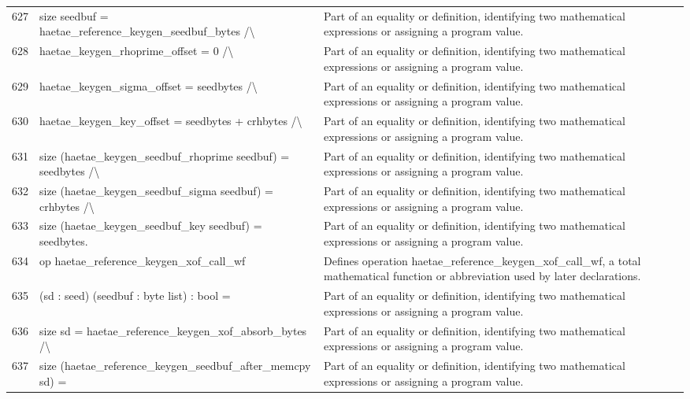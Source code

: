 \documentclass[10pt]{article}
\begin{document}
\begin{longtable}{r L{0.53\textwidth} L{0.37\textwidth}}
627 & {\ttfamily\scriptsize   size seedbuf = haetae\_reference\_keygen\_seedbuf\_bytes /\textbackslash{}} & Part of an equality or definition, identifying two mathematical expressions or assigning a program value. \\
628 & {\ttfamily\scriptsize   haetae\_keygen\_rhoprime\_offset = 0 /\textbackslash{}} & Part of an equality or definition, identifying two mathematical expressions or assigning a program value. \\
629 & {\ttfamily\scriptsize   haetae\_keygen\_sigma\_offset = seedbytes /\textbackslash{}} & Part of an equality or definition, identifying two mathematical expressions or assigning a program value. \\
630 & {\ttfamily\scriptsize   haetae\_keygen\_key\_offset = seedbytes + crhbytes /\textbackslash{}} & Part of an equality or definition, identifying two mathematical expressions or assigning a program value. \\
631 & {\ttfamily\scriptsize   size (haetae\_keygen\_seedbuf\_rhoprime seedbuf) = seedbytes /\textbackslash{}} & Part of an equality or definition, identifying two mathematical expressions or assigning a program value. \\
632 & {\ttfamily\scriptsize   size (haetae\_keygen\_seedbuf\_sigma seedbuf) = crhbytes /\textbackslash{}} & Part of an equality or definition, identifying two mathematical expressions or assigning a program value. \\
633 & {\ttfamily\scriptsize   size (haetae\_keygen\_seedbuf\_key seedbuf) = seedbytes.} & Part of an equality or definition, identifying two mathematical expressions or assigning a program value. \\
634 & {\ttfamily\scriptsize op haetae\_reference\_keygen\_xof\_call\_wf} & Defines operation haetae\_reference\_keygen\_xof\_call\_wf, a total mathematical function or abbreviation used by later declarations. \\
635 & {\ttfamily\scriptsize    (sd : seed) (seedbuf : byte list) : bool =} & Part of an equality or definition, identifying two mathematical expressions or assigning a program value. \\
636 & {\ttfamily\scriptsize   size sd = haetae\_reference\_keygen\_xof\_absorb\_bytes /\textbackslash{}} & Part of an equality or definition, identifying two mathematical expressions or assigning a program value. \\
637 & {\ttfamily\scriptsize   size (haetae\_reference\_keygen\_seedbuf\_after\_memcpy sd) =} & Part of an equality or definition, identifying two mathematical expressions or assigning a program value. \\

\end{longtable}
\end{document}
